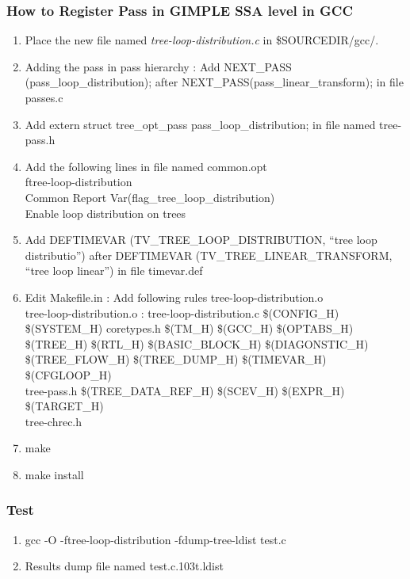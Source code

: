 \subsubsection*{How to Register Pass in GIMPLE SSA level in GCC}
\begin{enumerate}
\item Place the new file named \emph{tree-loop-distribution.c} in \$SOURCEDIR/gcc/.
\item Adding the pass in pass hierarchy : Add NEXT\_PASS (pass\_loop\_distribution); after NEXT\_PASS(pass\_linear\_transform); in file passes.c
\item Add extern struct tree\_opt\_pass pass\_loop\_distribution; in file named tree-pass.h
\item Add the following lines in file named common.opt\\
ftree-loop-distribution\\
Common Report Var(flag\_tree\_loop\_distribution)\\
Enable loop distribution on trees
\item Add DEFTIMEVAR (TV\_TREE\_LOOP\_DISTRIBUTION, ``tree loop distributio'') after DEFTIMEVAR (TV\_TREE\_LINEAR\_TRANSFORM, ``tree loop linear'') in file timevar.def
\item Edit Makefile.in : Add following rules
tree-loop-distribution.o \  \\
tree-loop-distribution.o : tree-loop-distribution.c \$(CONFIG\_H) \ \\
\$(SYSTEM\_H) coretypes.h \$(TM\_H) \$(GCC\_H) \$(OPTABS\_H) \ \\
\$(TREE\_H) \$(RTL\_H) \$(BASIC\_BLOCK\_H) \$(DIAGONSTIC\_H) \ \\
\$(TREE\_FLOW\_H) \$(TREE\_DUMP\_H) \$(TIMEVAR\_H) \$(CFGLOOP\_H) \ \\
tree-pass.h \$(TREE\_DATA\_REF\_H) \$(SCEV\_H) \$(EXPR\_H) \$(TARGET\_H) \ \\
tree-chrec.h 
\item make
\item make install
\end{enumerate}

\subsubsection*{Test}
\begin{enumerate}
\item gcc -O -ftree-loop-distribution -fdump-tree-ldist test.c
\item Results dump file named test.c.103t.ldist
\end{enumerate}
